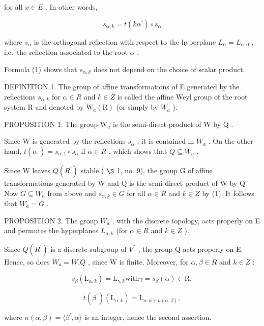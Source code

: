 for all \(x \in E\) . In other words,

\[
s _ {\alpha , k} = t (k \alpha^ {\prime}) \circ s _ {\alpha}\tag{1}
\]

where \(s_{\alpha}\) is the orthogonal reflection with respect to the hyperplane \(L_{\alpha} = L_{\alpha,0}\) , i.e.~the reflection associated to the root \(\alpha\) .

Formula (1) shows that \(s_{\alpha, k}\) does not depend on the choice of scalar product.

DEFINITION 1. The group of affine transformations of E generated by the reflections \(s_{\alpha,k}\) for \(\alpha \in R\) and \(k \in Z\) is called the affine Weyl group of the root system R and denoted by \(\mathrm{W}_{a}(\mathrm{R})\) (or simply by \(W_{a}\) ).

PROPOSITION 1. The group \(\mathrm{W}_a\) is the semi-direct product of \(\mathrm{W}\) by \(\mathrm{Q}\) .

Since W is generated by the reflections \(s_{\alpha}\) , it is contained in \(W_{a}\) . On the other hand, \(t(\alpha^{\prime}) = s_{\alpha,1} \circ s_{\alpha}\) if \(\alpha \in R\) , which shows that \(Q \subseteq W_{a}\) .

Since W leaves \(Q(R^{\prime})\) stable ( \(\S\) 1, no. 9), the group G of affine transformations generated by W and Q is the semi-direct product of W by Q. Now \(G \subseteq W_{a}\) from above and \(s_{\alpha,k} \in G\) for all \(\alpha \in R\) and \(k \in Z\) by (1). It follows that \(W_{a} = G\) .

PROPOSITION 2. The group \(W_{a}\) , with the discrete topology, acts properly on E and permutes the hyperplanes \(L_{\alpha,k}\) (for \(\alpha \in R\) and \(k \in Z\) ).

Since \(Q(R^{\prime})\) is a discrete subgroup of \(V^{*}\) , the group Q acts properly on E. Hence, so does \(W_{a} = W.Q\) , since W is finite. Moreover, for \(\alpha, \beta \in R\) and \(k \in Z\) :

\[
s _ {\beta} (\mathrm{L} _ {\alpha , k}) = \mathrm{L} _ {\gamma , k} \text {with} \gamma = s _ {\beta} (\alpha) \in \mathrm{R},
\]

\[
t (\beta^ {\prime}) \left(\mathrm{L} _ {\alpha , k}\right) = \mathrm{L} _ {\alpha , k + n (\alpha , \beta)},
\]

where \(n(\alpha, \beta) = \langle \beta^{\prime}, \alpha \rangle\) is an integer, hence the second assertion.

